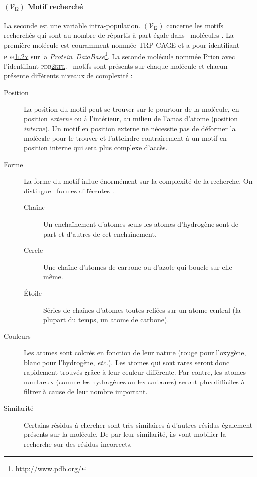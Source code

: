 \documentclass[myfrancais]{mythesis}
\newcommand{\mynum}[1]{\nombre{#1}}
\newcommand{\myvar}[2]{$\left(\mathcal{V}_{\mathrm{#1}#2}\right)$\xspace}
\newcommand{\myvari}[1]{\myvar{i}{#1}}
\newcommand{\myPDB}{\textsc{pdb}\xspace}
\newcommand{\myPDBbase}{\emph{Protein~DataBase}\xspace}
\newcommand{\myPDBlink}[2]{\href{#1}{\textsc{\MakeLowercase{#2}}}}
\newcommand{\TRPCAGE}{TRP-CAGE\xspace}
\newcommand{\Prion}{Prion\xspace}
\newcommand{\myemph}[1]{\emph{#1}}
\newcommand{\myetc}{\textit{etc.}\xspace}
\begin{document}
	\paragraph{\myvari{2} Motif recherché}
	La seconde  est une variable intra-population.
	\myvari{2} concerne les motifs recherchés qui sont au nombre de \mynum{10} répartis à part égale dans \mynum{2}~molécules .
	La première molécule est couramment nommée \TRPCAGE {} et a pour identifiant \myPDB \myPDBlink{http://www.rcsb.org/pdb/explore/explore.do?structureId=1L2Y}{1L2Y} sur la \myPDBbase\footnote{\url{http://www.pdb.org/}}.
	La seconde molécule nommée \Prion {} avec l'identifiant \myPDB \myPDBlink{http://www.rcsb.org/pdb/explore/explore.do?structureId=2KFL}{2KFL}.
	\mynum{5}~motifs sont présents sur chaque molécule  et chacun présente différents niveaux de complexité  :
	\begin{description}
		\item[Position] La position du motif peut se trouver sur le pourtour de la molécule, en position \myemph{externe} ou à l'intérieur, au milieu de l'amas d'atome (position \myemph{interne}).
			Un motif en position externe ne nécessite pas de déformer la molécule pour le trouver et l'atteindre contrairement à un motif en position interne qui sera plus complexe d'accès.
		\item[Forme] La forme du motif influe énormément sur la complexité de la recherche.
			On distingue \mynum{3}~formes différentes :
			\begin{description}
				\item[Chaîne] Un enchaînement d'atomes seuls les atomes d'hydrogène sont de part et d'autres de cet enchaînement.
				\item[Cercle] Une chaîne d'atomes de carbone ou d'azote qui boucle sur elle-même.
				\item[Étoile] Séries de chaînes d'atomes toutes reliées sur un atome central (la plupart du temps, un atome de carbone).
			\end{description}
		\item[Couleurs] Les atomes sont colorés en fonction de leur nature (rouge pour l'oxygène, blanc pour l'hydrogène, \myetc).
			Les atomes qui sont rares seront donc rapidement trouvés grâce à leur couleur différente.
			Par contre, les atomes nombreux (comme les hydrogènes ou les carbones) seront plus difficiles à filtrer à cause de leur nombre important.
		\item[Similarité] Certains résidus à chercher sont très similaires à d'autres résidus également présents sur la molécule.
			De par leur similarité, ils vont mobilier la recherche sur des résidus incorrects.
	\end{description}
\end{document}

